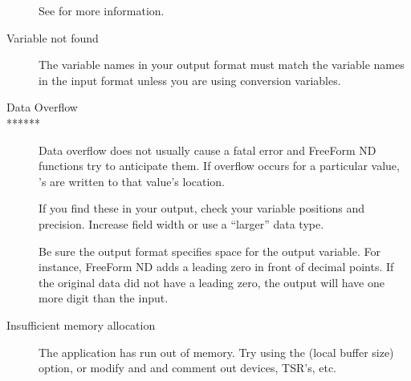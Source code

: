 \begin{description}
  See  for more information.

\item[Variable not found]
  
  The variable names in your output format must match the variable
  names in the input format unless you are using conversion variables.

\item[Data Overflow]

\item[******]
  
  Data overflow does not usually cause a fatal error and FreeForm ND
  functions try to anticipate them. If overflow occurs for a
  particular value, \lit{***}'s are written to that value's location.
  
  If you find these in your output, check your variable positions and
  precision. Increase field width or use a ``larger'' data type.
  
  Be sure the output format specifies space for the output variable.
  For instance, FreeForm ND adds a leading zero in front of decimal
  points. If the original data did not have a leading zero, the output
  will have one more digit than the input.

\item[Insufficient memory allocation]
  
  The application has run out of memory. Try using the  (local
  buffer size) option, or modify  and
   and comment out devices, TSR's, etc.
\end{description}

